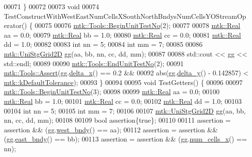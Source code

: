 \begin{DoxyCode}
00071 \}
00072 
00073 \textcolor{keywordtype}{void}
00074 TestConstructWithWestEastNumCellsXSouthNorthBndysNumCellsYOStreamOperator() \{
00075 
00076   \hyperlink{classmtk_1_1Tools_afc29ecaf337a13ed2e817d3890a5a441}{mtk::Tools::BeginUnitTestNo}(2);
00077 
00078   \hyperlink{group__c01-roots_gac080bbbf5cbb5502c9f00405f894857d}{mtk::Real} aa = 0.0;
00079   \hyperlink{group__c01-roots_gac080bbbf5cbb5502c9f00405f894857d}{mtk::Real} bb = 1.0;
00080   \hyperlink{group__c01-roots_gac080bbbf5cbb5502c9f00405f894857d}{mtk::Real} cc = 0.0;
00081   \hyperlink{group__c01-roots_gac080bbbf5cbb5502c9f00405f894857d}{mtk::Real} dd = 1.0;
00082 
00083   \textcolor{keywordtype}{int} nn = 5;
00084   \textcolor{keywordtype}{int} mm = 7;
00085 
00086   \hyperlink{classmtk_1_1UniStgGrid2D}{mtk::UniStgGrid2D} gg(aa, bb, nn, cc, dd, mm);
00087 
00088   std::cout << gg << std::endl;
00089 
00090   \hyperlink{classmtk_1_1Tools_aba67d9dc35c9c1c49430fcc9ea035e03}{mtk::Tools::EndUnitTestNo}(2);
00091   \hyperlink{classmtk_1_1Tools_ac6804df469c94ab6a796fb64f1e44a89}{mtk::Tools::Assert}(gg.\hyperlink{classmtk_1_1UniStgGrid2D_aca4710004c4a7da6a9e8fd6ab32a691f}{delta\_x}() == 0.2 &&
00092                      abs(gg.\hyperlink{classmtk_1_1UniStgGrid2D_a65a78cfc80ffdbeb282ed57af4dc5cb4}{delta\_y}() - 0.142857) < 
      \hyperlink{group__c01-roots_gae914b125d81d1b97e0aee7bbc7739786}{mtk::kDefaultTolerance});
00093 \}
00094 
00095 \textcolor{keywordtype}{void} TestGetters() \{
00096 
00097   \hyperlink{classmtk_1_1Tools_afc29ecaf337a13ed2e817d3890a5a441}{mtk::Tools::BeginUnitTestNo}(3);
00098 
00099   \hyperlink{group__c01-roots_gac080bbbf5cbb5502c9f00405f894857d}{mtk::Real} aa = 0.0;
00100   \hyperlink{group__c01-roots_gac080bbbf5cbb5502c9f00405f894857d}{mtk::Real} bb = 1.0;
00101   \hyperlink{group__c01-roots_gac080bbbf5cbb5502c9f00405f894857d}{mtk::Real} cc = 0.0;
00102   \hyperlink{group__c01-roots_gac080bbbf5cbb5502c9f00405f894857d}{mtk::Real} dd = 1.0;
00103 
00104   \textcolor{keywordtype}{int} nn = 5;
00105   \textcolor{keywordtype}{int} mm = 7;
00106 
00107   \hyperlink{classmtk_1_1UniStgGrid2D}{mtk::UniStgGrid2D} gg(aa, bb, nn, cc, dd, mm);
00108 
00109   \textcolor{keywordtype}{bool} assertion\{\textcolor{keyword}{true}\};
00110 
00111   assertion = assertion && (gg.\hyperlink{classmtk_1_1UniStgGrid2D_af2b1712387ded85edaf2b64617d3fc13}{west\_bndy}() == aa);
00112   assertion = assertion && (gg.\hyperlink{classmtk_1_1UniStgGrid2D_a03f689eb29a6369b82ce1207c655d5ff}{east\_bndy}() == bb);
00113   assertion = assertion && (gg.\hyperlink{classmtk_1_1UniStgGrid2D_a2d182866a398aba8e4829590e85bf939}{num\_cells\_x}() == nn);

\end{DoxyCode}
